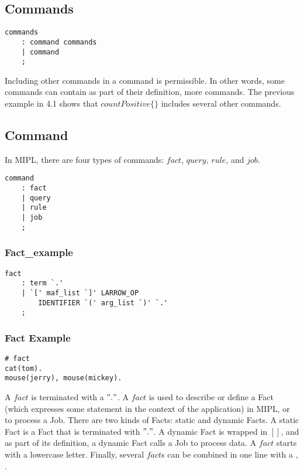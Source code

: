 \documentclass[prodmode,acmtecs]{acmsmall}
\begin{document}
\subsection{Commands}

\begin{lstlisting}
commands
	: command commands
	| command
	;
\end{lstlisting}

Including other commands in a command is permissible. In other words, some commands
 can contain as part of their definition, more commands. The previous example in 4.1
 shows that $countPositive\{\}$ includes several other commands. 
\medskip

\subsection{Command}

In MIPL, there are four types of commands: $fact$, $query$, $rule$, and $job$.

\begin{lstlisting}
command
	: fact
	| query
	| rule
	| job
	;
\end{lstlisting}
\medskip


\subsubsection{Fact_example}
\begin{lstlisting}
fact
	: term `.'			
	| `[' maf_list `]' LARROW_OP
		IDENTIFIER `(' arg_list `)' `.'
	;
\end{lstlisting}

\subsubsection{Fact Example}
\begin{lstlisting}
# fact
cat(tom).
mouse(jerry), mouse(mickey).
\end{lstlisting}

A $fact$ is terminated with a $"."$. A $fact$ is used to describe or define a Fact (which 
 expresses some statement in the context of the application) in MIPL, or to
 process a Job. There are two kinds of Facts: static and dynamic Facts. A static Fact 
 is a Fact that is terminated with $"."$. A dynamic Fact is wrapped in $[ ]$, 
 and as part of its definition, a dynamic Fact calls a Job to process data. A $fact$
 starts with a lowercase letter. Finally, several $fact$s can be combined
 in one line with a $,$.
\medskip
\end{document}
